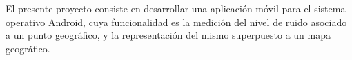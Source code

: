 

	El presente proyecto consiste en desarrollar una aplicación móvil para el sistema operativo Android, cuya funcionalidad es la medición del nivel de ruido asociado a un punto geográfico, y la representación del mismo superpuesto a un mapa geográfico.


\chapterend